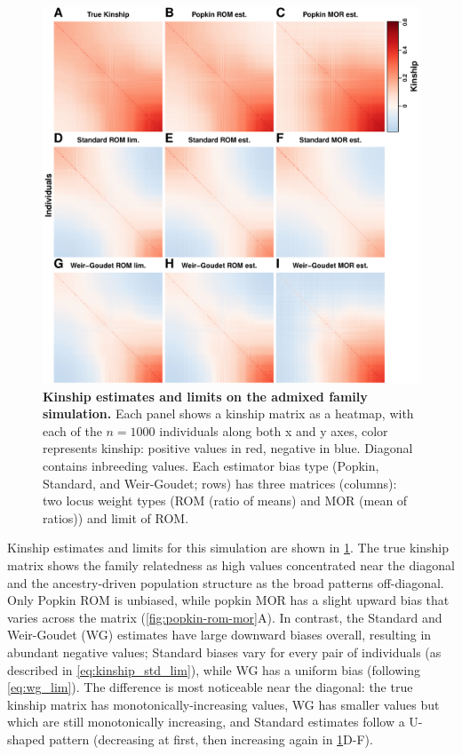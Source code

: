 \documentclass[11pt]{article}
\begin{document}
\begin{linenumbers}
\begin{figure}[bp!]
  \centering
  \includegraphics[height=0.8\textheight]{sim-admix-n1000-m100000-k3-f0.3-s0.5-mc100-h0.8-g20-fes/kinship.pdf}
  \caption{
    {\bf Kinship estimates and limits on the admixed family simulation.}
    Each panel shows a kinship matrix as a heatmap, with each of the $n=1000$ individuals along both x and y axes, color represents kinship: positive values in red, negative in blue.
    Diagonal contains inbreeding values.
    Each estimator bias type (Popkin, Standard, and Weir-Goudet; rows) has three matrices (columns): two locus weight types (ROM (ratio of means) and MOR (mean of ratios)) and limit of ROM.
  }
  \label{fig:kinship_sim}
\end{figure}

Kinship estimates and limits for this simulation are shown in \cref{fig:kinship_sim}.
The true kinship matrix shows the family relatedness as high values concentrated near the diagonal and the ancestry-driven population structure as the broad patterns off-diagonal.
Only Popkin ROM is unbiased, while popkin MOR has a slight upward bias that varies across the matrix (\cref{fig:popkin-rom-mor}A).
In contrast, the Standard and Weir-Goudet (WG) estimates have large downward biases overall, resulting in abundant negative values; Standard biases vary for every pair of individuals (as described in \cref{eq:kinship_std_lim}), while WG has a uniform bias (following \cref{eq:wg_lim}).
The difference is most noticeable near the diagonal: the true kinship matrix has monotonically-increasing values, WG has smaller values but which are still monotonically increasing, and Standard estimates follow a U-shaped pattern (decreasing at first, then increasing again in \cref{fig:kinship_sim}D-F).


\end{linenumbers}
\end{document}
